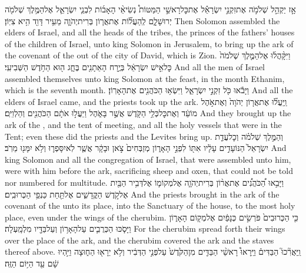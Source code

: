 {אָ֣ז יַקְהֵ֣ל שְׁלֹמֹ֣ה אֶת\maqqaf זִקְנֵ֣י יִשְׂרָאֵ֡ל אֶת\maqqaf כׇּל\maqqaf רָאשֵׁ֣י הַמַּטּוֹת֩ נְשִׂיאֵ֨י הָאָב֜וֹת לִבְנֵ֧י יִשְׂרָאֵ֛ל אֶל\maqqaf הַמֶּ֥לֶךְ שְׁלֹמֹ֖ה יְרוּשָׁלָ֑͏ִם לְֽהַעֲל֞וֹת אֶת\maqqaf אֲר֧וֹן בְּרִית\maqqaf יְהֹוָ֛ה מֵעִ֥יר דָּוִ֖ד הִ֥יא צִיּֽוֹן׃}
{Then Solomon assembled the elders of Israel, and all the heads of the tribes, the princes of the fathers’ houses of the children of Israel, unto king Solomon in Jerusalem, to bring up the ark of the covenant of the \lord\space out of the city of David, which is Zion.}
{וַיִּקָּ֨הֲל֜וּ אֶל\maqqaf הַמֶּ֤לֶךְ שְׁלֹמֹה֙ כׇּל\maqqaf אִ֣ישׁ יִשְׂרָאֵ֔ל בְּיֶ֥רַח הָאֵתָנִ֖ים בֶּחָ֑ג ה֖וּא הַחֹ֥דֶשׁ הַשְּׁבִיעִֽי׃}
{And all the men of Israel assembled themselves unto king Solomon at the feast, in the month Ethanim, which is the seventh month.}
{וַיָּבֹ֕אוּ כֹּ֖ל זִקְנֵ֣י יִשְׂרָאֵ֑ל וַיִּשְׂא֥וּ הַכֹּהֲנִ֖ים אֶת\maqqaf הָאָרֽוֹן׃}
{And all the elders of Israel came, and the priests took up the ark.}
{וַֽיַּעֲל֞וּ אֶת\maqqaf אֲר֤וֹן יְהֹוָה֙ וְאֶת\maqqaf אֹ֣הֶל מוֹעֵ֔ד וְאֶת\maqqaf כׇּל\maqqaf כְּלֵ֥י הַקֹּ֖דֶשׁ אֲשֶׁ֣ר בָּאֹ֑הֶל וַיַּעֲל֣וּ אֹתָ֔ם הַכֹּהֲנִ֖ים וְהַלְוִיִּֽם׃}
{And they brought up the ark of the \lord, and the tent of meeting, and all the holy vessels that were in the Tent; even these did the priests and the Levites bring up.}
{וְהַמֶּ֣לֶךְ שְׁלֹמֹ֗ה וְכׇל\maqqaf עֲדַ֤ת יִשְׂרָאֵל֙ הַנּוֹעָדִ֣ים עָלָ֔יו אִתּ֖וֹ לִפְנֵ֣י הָאָר֑וֹן מְזַבְּחִים֙ צֹ֣אן וּבָקָ֔ר אֲשֶׁ֧ר לֹֽא\maqqaf יִסָּפְר֛וּ וְלֹ֥א יִמָּנ֖וּ מֵרֹֽב׃}
{And king Solomon and all the congregation of Israel, that were assembled unto him, were with him before the ark, sacrificing sheep and oxen, that could not be told nor numbered for multitude.}
{וַיָּבִ֣אוּ הַ֠כֹּהֲנִ֠ים אֶת\maqqaf אֲר֨וֹן בְּרִית\maqqaf יְהֹוָ֧ה אֶל\maqqaf מְקוֹמ֛וֹ אֶל\maqqaf דְּבִ֥יר הַבַּ֖יִת אֶל\maqqaf קֹ֣דֶשׁ הַקֳּדָשִׁ֑ים אֶל\maqqaf תַּ֖חַת כַּנְפֵ֥י הַכְּרוּבִֽים׃}
{And the priests brought in the ark of the covenant of the \lord\space unto its place, into the Sanctuary of the house, to the most holy place, even under the wings of the cherubim.}
{כִּ֤י הַכְּרוּבִים֙ פֹּרְשִׂ֣ים כְּנָפַ֔יִם אֶל\maqqaf מְק֖וֹם הָאָר֑וֹן וַיָּסֹ֧כּוּ הַכְּרֻבִ֛ים עַל\maqqaf הָאָר֥וֹן וְעַל\maqqaf בַּדָּ֖יו מִלְמָֽעְלָה׃}
{For the cherubim spread forth their wings over the place of the ark, and the cherubim covered the ark and the staves thereof above.}
{וַֽיַּאֲרִ֘כוּ֮ הַבַּדִּים֒ וַיֵּֽרָאוּ֩ רָאשֵׁ֨י הַבַּדִּ֤ים מִן\maqqaf הַקֹּ֙דֶשׁ֙ עַל\maqqaf פְּנֵ֣י הַדְּבִ֔יר וְלֹ֥א יֵרָא֖וּ הַח֑וּצָה וַיִּ֣הְיוּ שָׁ֔ם עַ֖ד הַיּ֥וֹם הַזֶּֽה׃}
